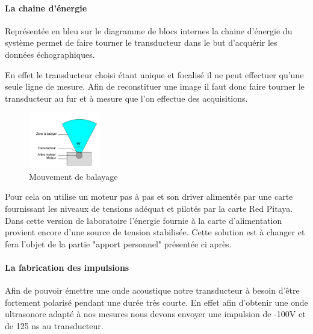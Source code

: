 \documentclass[12pt]{article}
\begin{document}
\paragraph{La chaine d'énergie}

Représentée en bleu sur le diagramme de blocs internes la chaine d'énergie du système permet de faire tourner le transducteur dans le but d'acquérir les données échographiques.\par
En effet le transducteur choisi étant unique et focalisé il ne peut effectuer qu'une seule ligne de mesure. Afin de reconstituer une image il faut donc faire tourner le transducteur au fur et à mesure que l'on effectue des acquisitions.\par
\newpage
\begin{figure}
  \vspace{-30pt}
  \begin{center}
    \includegraphics[width=0.28\textwidth]{Images_Rapport/balayage}
  \end{center}
  \vspace{-5pt}
  \caption{Mouvement de balayage}
  \vspace{-10pt}
\end{figure}
\vspace{10pt}
Pour cela on utilise un moteur pas à pas et son driver alimentés par une carte fournissant les niveaux de tensions adéquat et pilotés par la carte Red Pitaya.
Dans cette version de laboratoire l'énergie fournie à la carte d'alimentation provient encore d'une source de tension stabilisée. Cette solution est à changer et fera l'objet de la partie "apport personnel" présentée ci après.\par


\vspace{20pt}
\paragraph{La fabrication des impulsions}

Afin de pouvoir émettre une onde acoustique notre transducteur à besoin d'être fortement polarisé pendant une durée très courte. En effet afin d'obtenir une onde ultrasonore adapté à nos mesures nous devons envoyer une impulsion de -100V et de 125 ns au transducteur.\par
\end{document}
